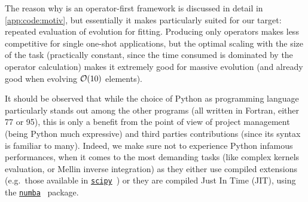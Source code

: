 The reason why \eko{} is an operator-first framework is discussed in detail in
\cref{app:code:motiv}, but essentially it makes \eko{} particularly suited for
our target: repeated evaluation of evolution for \pdf{} fitting.
Producing only operators makes \eko{} less competitive for single one-shot
applications, but the optimal scaling with the size of the task (practically
constant, since the time consumed is dominated by the operator calculation)
makes it extremely good for massive evolution (and already good when evolving
$\order{10}$ elements).

It should be observed that while the choice of Python as programming language
particularly stands out among the other programs (all written in Fortran,
either 77 or 95), this is only a benefit from the point of view of project
management (being Python much expressive) and third parties contributions
(since its syntax is familiar to many).
Indeed, we make sure not to experience Python infamous performances, when it
comes to the most demanding tasks (like complex kernels evaluation, or Mellin
inverse integration) as they either use compiled extensions (e.g.\ those available
in \href{https://scipy.org/}{\texttt{scipy}}~\cite{2020SciPy-NMeth}) or they are compiled Just In
Time (JIT), using the \href{https://numba.pydata.org/}{\texttt{numba}}~\cite{numba} package.



